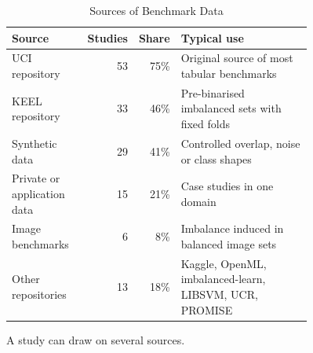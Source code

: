 \begin{table}[t]
  \caption{Sources of Benchmark Data}
  \label{tab:empirical-sources}
  \footnotesize
  \setlength{\tabcolsep}{4pt}
  \begin{tabular}{@{}p{0.26\linewidth}rrp{0.5\linewidth}@{}}
    \toprule
    Source & Studies & Share & Typical use\\
    \midrule
    UCI repository & 53 & 75\% & Original source of most tabular benchmarks\\
    KEEL repository & 33 & 46\% & Pre-binarised imbalanced sets with fixed folds\\
    Synthetic data & 29 & 41\% & Controlled overlap, noise or class shapes\\
    Private or application data & 15 & 21\% & Case studies in one domain\\
    Image benchmarks & 6 & 8\% & Imbalance induced in balanced image sets\\
    Other repositories & 13 & 18\% & Kaggle, OpenML, imbalanced-learn, LIBSVM, UCR, PROMISE\\
    \bottomrule
  \end{tabular}
  \par\smallskip\raggedright\scriptsize A study can draw on several sources.
\end{table}

